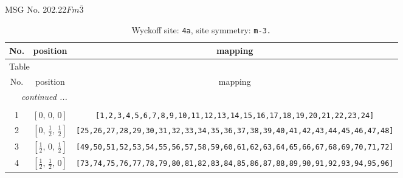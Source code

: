 \documentclass[fleqn,8pt]{jsarticle}
\begin{document}
\setcounter{MaxMatrixCols}{32}

\renewcommand{\tablename}{Table~}
\renewcommand{\figurename}{Figure~}
\begin{center}
\LARGE
MSG No. 202.22\quad$Fm\bar{3}$
\end{center}
\renewcommand{\arraystretch}{1.2}
\begin{longtable}{ccc}
\caption{Wyckoff site: {\tt 4a}, site symmetry: {\tt m-3.}}
 \\
 \hline \hline
No. & position & mapping \\ \hline \endfirsthead

\multicolumn{2}{l}{\tablename\ \thetable{}} \\
 \hline \hline
No. & position & mapping \\ \hline \endhead

 \hline \hline
\multicolumn{2}{r}{\footnotesize\it continued ...} \\ \endfoot

 \hline \hline
\multicolumn{2}{r}{} \\ \endlastfoot

1 & $\left[ 0,\, 0,\, 0 \right]$ & {\tt [1,2,3,4,5,6,7,8,9,10,11,12,13,14,15,16,17,18,19,20,21,22,23,24]} \\ \hline
2 & $\left[ 0,\, \frac{1}{2},\, \frac{1}{2} \right]$ & {\tt [25,26,27,28,29,30,31,32,33,34,35,36,37,38,39,40,41,42,43,44,45,46,47,48]} \\ \hline
3 & $\left[ \frac{1}{2},\, 0,\, \frac{1}{2} \right]$ & {\tt [49,50,51,52,53,54,55,56,57,58,59,60,61,62,63,64,65,66,67,68,69,70,71,72]} \\ \hline
4 & $\left[ \frac{1}{2},\, \frac{1}{2},\, 0 \right]$ & {\tt [73,74,75,76,77,78,79,80,81,82,83,84,85,86,87,88,89,90,91,92,93,94,95,96]} \\
\end{longtable}
\renewcommand{\arraystretch}{1.2}
\end{document}
